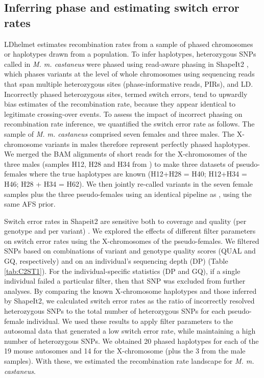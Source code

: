 \subsection{Inferring phase and estimating switch error rates}
 
LDhelmet estimates recombination rates from a sample of phased chromosomes or haplotypes drawn from a population. To infer haplotypes, heterozygous SNPs called in \textit{M. m. castaneus} were phased using read-aware phasing in ShapeIt2 \citep{RN231}, which phases variants at the level of whole chromosomes using sequencing reads that span multiple heterozygous sites (phase-informative reads, PIRs), and LD. Incorrectly phased heterozygous sites, termed switch errors, tend to upwardly bias estimates of the recombination rate, because they appear identical to legitimate crossing-over events. To assess the impact of incorrect phasing on recombination rate inference, we quantified the switch error rate as follows. The sample of \textit{M. m. castaneus} comprised seven females and three males. The X-chromosome variants in males therefore represent perfectly phased haplotypes. We merged the BAM alignments of short reads for the X-chromosomes of the three males (samples H12, H28 and H34 from \citealt{RN122}) to make three datasets of pseudo-females where the true haplotypes are known (H12+H28 = H40; H12+H34 = H46; H28 + H34 = H62). We then jointly re-called variants in the seven female samples plus the three pseudo-females using an identical pipeline as \cite{RN122}, using the same AFS prior.
 
Switch error rates in Shapeit2 are sensitive both to coverage and quality (per genotype and per variant) \citep{RN231}. We explored the effects of different filter parameters on switch error rates using the X-chromosomes of the pseudo-females. We filtered SNPs based on combinations of variant and genotype quality scores (QUAL and GQ, respectively) and on an individual’s sequencing depth (DP) (Table \ref{tab:C2ST1}). For the individual-specific statistics (DP and GQ), if a single individual failed a particular filter, then that SNP was excluded from further analyses. By comparing the known X-chromosome haplotypes and those inferred by ShapeIt2, we calculated switch error rates as the ratio of incorrectly resolved heterozygous SNPs to the total number of heterozygous SNPs for each pseudo-female individual. We used these results to apply filter parameters to the autosomal data that generated a low switch error rate, while maintaining a high number of heterozygous SNPs. We obtained 20 phased haplotypes for each of the 19 mouse autosomes and 14 for the X-chromosome (plus the 3 from the male samples). With these, we estimated the recombination rate landscape for \textit{M. m. castaneus}.
 
